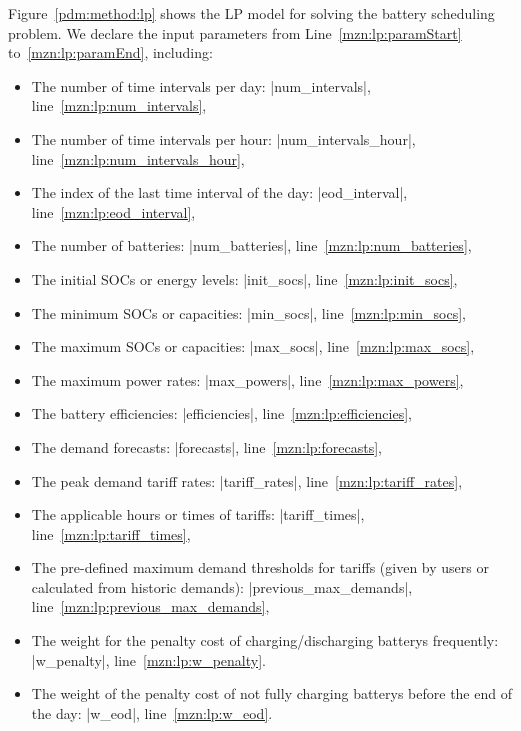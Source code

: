 Figure~\ref{pdm:method:lp} shows the \gls{LP} model for solving the battery scheduling problem.
We declare the input parameters from Line~\ref{mzn:lp:paramStart} to~\ref{mzn:lp:paramEnd}, including:
\begin{itemize}
	\item The number of time intervals per day: \mzninline|num_intervals|, line~\ref{mzn:lp:num_intervals},
	
	\item The number of time intervals per hour: \mzninline|num_intervals_hour|, line~\ref{mzn:lp:num_intervals_hour},
	
	\item The index of the last time interval of the day: \mzninline|eod_interval|, line~\ref{mzn:lp:eod_interval},
	
	\item The number of batteries: \mzninline|num_batteries|, line~\ref{mzn:lp:num_batteries},
	
	\item The initial \glspl{SOC} or energy levels: \mzninline|init_socs|, line~\ref{mzn:lp:init_socs},
	
	\item The minimum \glspl{SOC} or capacities: \mzninline|min_socs|, line~\ref{mzn:lp:min_socs},
	
	\item The maximum \glspl{SOC} or capacities: \mzninline|max_socs|, line~\ref{mzn:lp:max_socs},
	
	\item The maximum power rates: \mzninline|max_powers|, line~\ref{mzn:lp:max_powers},
	
	\item The battery efficiencies: \mzninline|efficiencies|, line~\ref{mzn:lp:efficiencies},
	
	\item The demand forecasts: \mzninline|forecasts|, line~\ref{mzn:lp:forecasts},
	
	\item The peak demand tariff rates: \mzninline|tariff_rates|, line~\ref{mzn:lp:tariff_rates},
	
	\item The applicable hours or times of tariffs: \mzninline|tariff_times|, line~\ref{mzn:lp:tariff_times},
	
	\item The pre-defined maximum demand thresholds for tariffs (given by users or calculated from historic demands): \mzninline|previous_max_demands|, line~\ref{mzn:lp:previous_max_demands},
	
	\item The weight for the penalty cost of charging/discharging \glspl{battery} frequently: \mzninline|w_penalty|, line~\ref{mzn:lp:w_penalty}.
	
	\item The weight of the penalty cost of not fully charging \glspl{battery} before the end of the day: \mzninline|w_eod|, line~\ref{mzn:lp:w_eod}.
\end{itemize}

